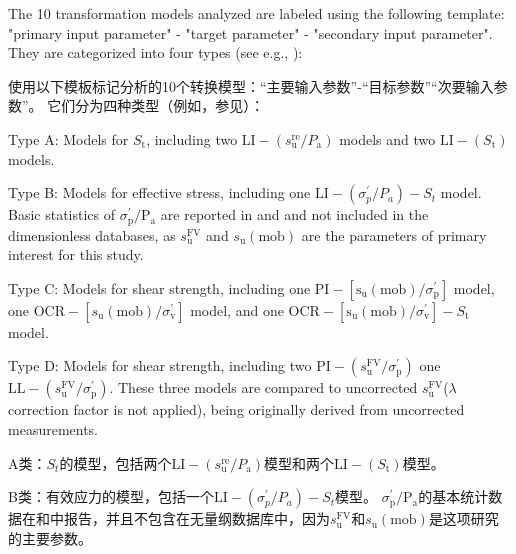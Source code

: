 \begin{ParaColumn}
    \switchcolumn*

    The 10 transformation models analyzed are labeled using the following template: "primary input parameter" - "target parameter" - "secondary input parameter". They are categorized into four types (see e.g., ):

    \switchcolumn
        
    使用以下模板标记分析的10个转换模型：“主要输入参数”-“目标参数”“次要输入参数”。 它们分为四种类型（例如，参见）：

    
    \switchcolumn*

    Type A: Models for $S_{\mathrm{t}}$, including two $\mathrm{LI}-\left(s_{\mathrm{u}}^{\mathrm{re}} / P_{\mathrm{a}}\right)$ models and two $\mathrm{LI}-\left(S_{\mathrm{t}}\right)$ models.
 
    Type B:  Models for effective stress, including one $\mathrm{LI}-\left(\sigma_{p}^{\prime} / P_{a}\right)-S_{t}$ model. Basic statistics of $\sigma_{\mathrm{p}}^{\prime} / \mathrm{P}_{\mathrm{a}}$ are reported in  and  and not included in the dimensionless databases, as $s_{\mathrm{u}}^{\mathrm{FV}}$ and $s_{\mathrm{u}}(\mathrm{mob})$ are the parameters of primary interest for this study. 
    
    Type C: Models for shear strength, including one $\mathrm{PI}-\left[\mathrm{s}_{\mathrm{u}}(\mathrm{mob}) / \sigma_{\mathrm{p}}^{\prime}\right]$ model, one $\mathrm{OCR}-\left[s_{\mathrm{u}}(\mathrm{mob}) / \sigma_{\mathrm{v}}^{\prime}\right]$ model, and one $\mathrm{OCR}-\left[\mathrm{s}_{\mathrm{u}}(\mathrm{mob}) / \sigma_{\mathrm{v}}^{\prime}\right]-S_{\mathrm{t}}$ model. 
    
    Type D: Models for shear strength, including two $\mathrm{PI}-\left(s_{\mathrm{u}}^{\mathrm{FV}} / \sigma_{\mathrm{p}}^{\prime}\right)$ one $\mathrm{LL}-\left(s_{\mathrm{u}}^{\mathrm{FV}} / \sigma_{\mathrm{p}}^{\prime}\right)$. These three models are compared to uncorrected $s_{\mathrm{u}}^{\mathrm{FV}}$($\lambda$ correction factor is not applied), being originally derived from uncorrected measurements.

    \switchcolumn

    A类：$S_t$的模型，包括两个$\mathrm{LI}-\left(s_{\mathrm{u}}^{\mathrm{re}} / P_{\mathrm{a}}\right)$模型和两个$\mathrm{LI}-\left(S_{\mathrm{t}}\right)$模型。
  
    B类：有效应力的模型，包括一个$\mathrm{LI}-\left(\sigma_{p}^{\prime} / P_{a}\right)-S_{t}$模型。  $\sigma_{\mathrm{p}}^{\prime} / \mathrm{P}_{\mathrm{a}}$的基本统计数据在和中报告，并且不包含在无量纲数据库中，因为$s_{\mathrm{u}}^{\mathrm{FV}}$和$s_{\mathrm{u}}(\mathrm{mob})$是这项研究的主要参数。
   

\end{ParaColumn}
